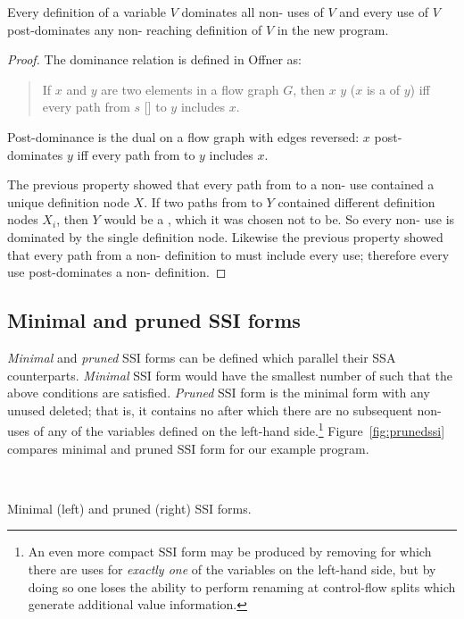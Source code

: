 \documentclass[12pt,titlepage,twoside]{article}
\begin{document}
\begin{property}
Every definition of a variable $V$ dominates all non-\phifunction{}
uses of $V$ and
every use of $V$ post-dominates any non-\sigfunction{}
reaching definition of $V$ in the
new program.
\end{property}
\begin{proof}
The dominance relation is defined in Offner \cite{offner95} as:
\begin{quote}
If $x$ and $y$ are two elements in a flow graph $G$, then $x$
 $y$ ($x$ is a  of $y$) iff
every path from $s$ [] to $y$ includes $x$.
\end{quote}
Post-dominance is the dual on a flow graph with edges reversed: $x$
post-dominates $y$ iff every path from  to $y$ includes $x$.

The previous property showed that every path from  to a
non-\phifunction{} use contained a unique definition node $X$.  If two
paths from  to $Y$ contained different definition nodes
$X_i$, then $Y$ would be a \phifunction, which it was chosen not to
be.  So every non-\phifunction{} use is dominated by the single
definition node.  Likewise the previous property showed that every
path from a non-\sigfunction{} definition to  must include
every use; therefore every use post-dominates a non-\sigfunction{}
definition.
\end{proof}

\subsection{Minimal and pruned SSI forms}
\emph{Minimal} and \emph{pruned} SSI forms can be defined which
parallel their SSA counterparts.  \emph{Minimal} SSI form would have
the smallest number of  such that the above
conditions are satisfied.  \emph{Pruned} SSI form is the minimal form
with any unused  deleted; that is, it contains no
 after which there are no subsequent
non-\phisigfunction[or]{} uses of any of the variables defined on the
left-hand side.\footnote{An even more compact SSI form may be produced
by removing  for which there are uses for \emph{exactly
one} of the variables on the left-hand side, but by doing so one loses
the ability to perform renaming at control-flow splits which generate
additional value information.}  Figure~\vref{fig:prunedssi} compares 
minimal and pruned SSI form for our example program.
\begin{myfigure}
\begin{center}
 \vline\ 
\end{center}
\caption[Minimal and pruned SSI forms.]
{Minimal (left) and pruned (right) SSI forms.}
\label{fig:prunedssi}
\end{myfigure}
\end{document}
